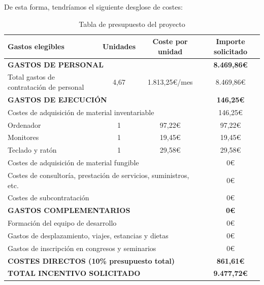 De esta forma, tendríamos el siguiente desglose de costes:
\begin{table}[H]
    \caption{Tabla de presupuesto del proyecto}\label{tab:presupuesto}
    \begin{center}
        \begin{tabularx}{\textwidth}{|X|c|c|c|}
            \hline
            \textbf{Gastos elegibles} & \textbf{Unidades} & \textbf{Coste por unidad} & \textbf{Importe solicitado} \\
            \hline
            \multicolumn{3}{|l|}{\textbf{GASTOS DE PERSONAL}} & \textbf{8.469,86\euro} \\
            Total gastos de contratación de personal & 4,67 & 1.813,25\euro/mes & 8.469,86\euro \\
            \hline
            \multicolumn{3}{|l|}{\textbf{GASTOS DE EJECUCIÓN}} & \textbf{146,25\euro} \\
            \multicolumn{3}{|l|}{Costes de adquisición de material inventariable} & 146,25\euro \\
            \quad Ordenador & 1 & 97,22\euro & 97,22\euro \\
            \quad Monitores & 1 & 19,45\euro & 19,45\euro \\
            \quad Teclado y ratón & 1 & 29,58\euro & 29,58\euro \\
            \multicolumn{3}{|l|}{Costes de adquisición de material fungible} & 0\euro \\
            \multicolumn{3}{|l|}{Costes de consultoría, prestación de servicios, suministros, etc.} & 0\euro \\
            \multicolumn{3}{|l|}{Costes de subcontratación} & 0\euro \\
            \multicolumn{3}{|l|}{\textbf{GASTOS COMPLEMENTARIOS}} & \textbf{0\euro} \\
            \multicolumn{3}{|l|}{Formación del equipo de desarrollo} & 0\euro \\
            \multicolumn{3}{|l|}{Gastos de desplazamiento, viajes, estancias y dietas} & 0\euro \\
            \multicolumn{3}{|l|}{Gastos de inscripción en congresos y seminarios} & 0\euro \\
            \hline
            \multicolumn{3}{|l|}{\textbf{COSTES DIRECTOS (10\% presupuesto total)}} & \textbf{861,61\euro} \\
            \hline
            \multicolumn{3}{|l|}{\textbf{TOTAL INCENTIVO SOLICITADO}} & \textbf{9.477,72\euro} \\
            \hline
        \end{tabularx}
    \end{center}
\end{table}



